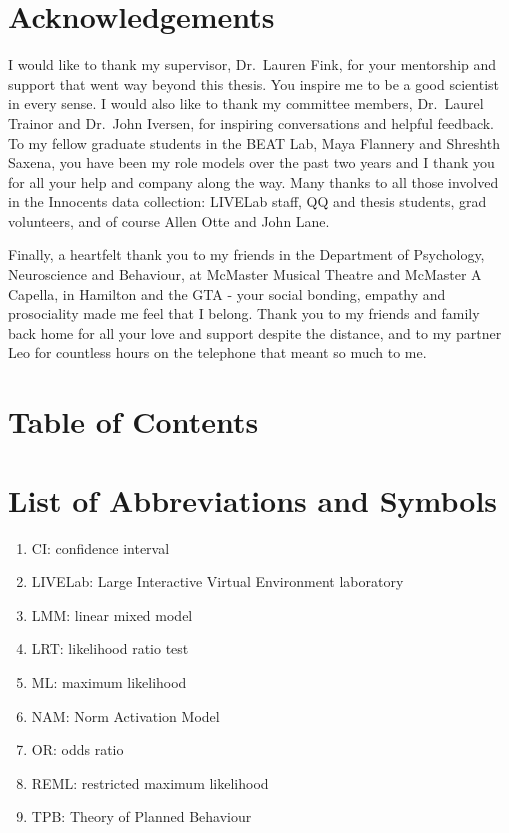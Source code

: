\documentclass[
  man,floatsintext]{apa6}
\providecommand{\tightlist}{%
  \setlength{\itemsep}{0pt}\setlength{\parskip}{0pt}}
\begin{document}
\section*{Acknowledgements}\label{acknowledgements}

I would like to thank my supervisor, Dr.~Lauren Fink, for your mentorship and support that went way beyond this thesis. You inspire me to be a good scientist in every sense. I would also like to thank my committee members, Dr.~Laurel Trainor and Dr.~John Iversen, for inspiring conversations and helpful feedback. To my fellow graduate students in the BEAT Lab, Maya Flannery and Shreshth Saxena, you have been my role models over the past two years and I thank you for all your help and company along the way. Many thanks to all those involved in the Innocents data collection: LIVELab staff, QQ and thesis students, grad volunteers, and of course Allen Otte and John Lane.

Finally, a heartfelt thank you to my friends in the Department of Psychology, Neuroscience and Behaviour, at McMaster Musical Theatre and McMaster A Capella, in Hamilton and the GTA - your social bonding, empathy and prosociality made me feel that I belong. Thank you to my friends and family back home for all your love and support despite the distance, and to my partner Leo for countless hours on the telephone that meant so much to me.

\newpage

\section*{Table of Contents}\label{table-of-contents}

\tableofcontents

\newpage

\listoffigures

\newpage

\listoftables

\newpage

\section*{List of Abbreviations and Symbols}\label{list-of-abbreviations-and-symbols}

\begin{enumerate}
\def\labelenumi{\arabic{enumi}.}
\tightlist
\item
  CI: confidence interval
\item
  LIVELab: Large Interactive Virtual Environment laboratory
\item
  LMM: linear mixed model
\item
  LRT: likelihood ratio test
\item
  ML: maximum likelihood
\item
  NAM: Norm Activation Model
\item
  OR: odds ratio
\item
  REML: restricted maximum likelihood
\item
  TPB: Theory of Planned Behaviour
\end{enumerate}
\end{document}
